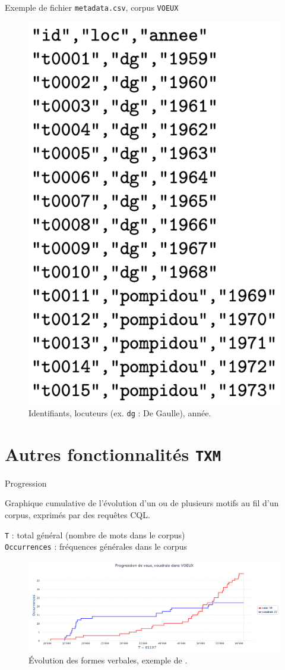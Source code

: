 \documentclass[xetex,xcolor={table,usenames,dvipsnames}]{beamer}
\begin{document}
\begin{frame}{Exemple de fichier \texttt{metadata.csv}, corpus \texttt{VOEUX}}
		\begin{figure}[h] %
		\centering
		\includegraphics[width=.4\linewidth]{img/metadata_csv.png}
		\caption{Identifiants, locuteurs (ex. \texttt{dg} : De Gaulle), année.}
		\label{fig:ling_out_TAL}
	\end{figure}
\end{frame}
\section{Autres fonctionnalités \texttt{TXM}}



\begin{frame}{Progression}
		\begin{block}{\vspace{-6mm}}
		\justifying
 Graphique cumulative de l'évolution d'un ou de plusieurs motifs au fil d'un corpus, exprimés par des requêtes \textsc{CQL}.
 \end{block}
 
{\small \texttt{T} : total général (nombre de mots dans le corpus)\\ \texttt{Occurrences} : fréquences générales dans le corpus}

	\begin{figure}[h] %
		\centering
		\includegraphics[width=.9\linewidth]{img/progression.png}
		\caption{Évolution des formes verbales, exemple de \textcite{lejeune2023}.}
		\label{fig:ling_out_TAL}
	\end{figure}
\end{frame}
\end{document}
